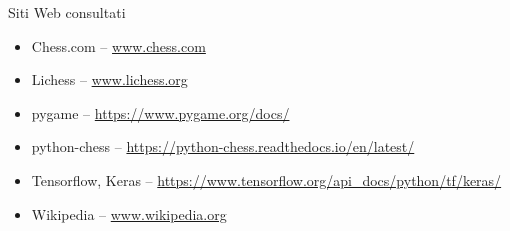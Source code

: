 \cleardoublepage
{}
{}
\nocite{*}


%

\vspace{2.5cm}
\begin{Large}Siti Web consultati\end{Large}
\begin{itemize}
\item Chess.com -- \url{www.chess.com}
\item Lichess -- \url{www.lichess.org}
\item pygame -- \url{https://www.pygame.org/docs/}
\item python-chess -- \url{https://python-chess.readthedocs.io/en/latest/}
\item Tensorflow, Keras -- \url{https://www.tensorflow.org/api_docs/python/tf/keras/}
\item Wikipedia -- \url{www.wikipedia.org}
\end{itemize}

